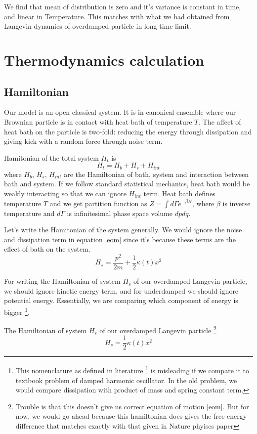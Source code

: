 \documentclass[11pt,a4paper]{article}
\begin{document}
We find that mean of distribution is zero and it's variance is constant in time, and linear in Temperature. This matches with what we had obtained from Langevin dynamics of overdamped particle in long time limit. 
\section{Thermodynamics calculation}
\subsection*{Hamiltonian}
Our model is an open classical system. It is in canonical ensemble where our Brownian particle is in contact with heat bath of temperature $T$. The affect of heat bath on the particle is two-fold: reducing the energy through dissipation and giving kick with a random force through noise term.

Hamitonian of the total system $H_t$ is 
\begin{equation}
H_t = H_b + H_s + H_{int}
\end{equation}
where $H_b$, $H_s$, $H_{int}$ are the Hamiltonian of bath, system and interaction between bath and system. If we follow standard statistical mechanics, heat bath would be weakly interacting so that we can ignore $H_{int}$ term. Heat bath defines temperature $T$ and we get partition function as $ Z= \int d\Gamma e^{-\beta H}$, where $\beta$ is inverse temperature and $d\Gamma$ is infinitesimal phase space volume $dpdq$.

Let's write the Hamitonian of the system generally. We would ignore the noise and dissipation term in equation \ref{eom} since it's because these terms are the effect of bath on the system.
\begin{equation}
H_s = \dfrac{p^2}{2m}   +\dfrac{1}{2} \kappa(t) x^2
\end{equation}

For writing the Hamiltonian of system $H_s$ of our overdamped Langevin particle,  we should ignore kinetic energy term, and for underdamped we should ignore potential energy. Essentially, we are comparing which component of energy is bigger \footnote{This nomenclature as defined in literature \footnote{include reference} is misleading if we compare it to textbook problem of damped harmonic oscillator. In the old problem, we would compare dissipation with product of mass and spring constant term.}.

The Hamiltonian of system $H_s$ of our overdamped Langevin particle \footnote{Trouble is that this doesn't give us correct equation of motion \ref{eom}. But for now, we would go ahead because this hamiltonian does gives the free energy difference that matches exactly with that given in Nature phyiscs paper }
\begin{equation}
H_s = \dfrac{1}{2} \kappa(t) x^2
\end{equation}
\end{document}

